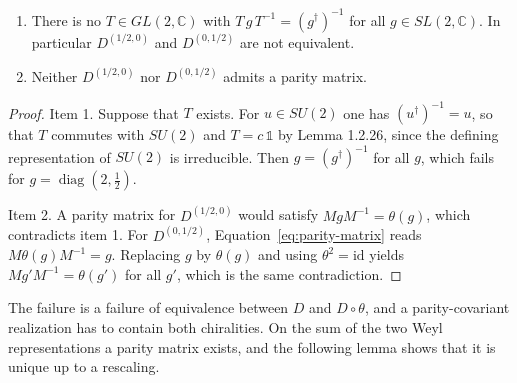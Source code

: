\begin{proposition}\label{prop:parity-problem}
	\begin{enumerate}
		\item There is no $T\in GL(2,\mathbb{C})$ with $T\,g\,T^{-1}=(g^\dagger)^{-1}$ for all $g\in SL(2,\mathbb{C})$. In particular $D^{(1/2,0)}$ and $D^{(0,1/2)}$ are not equivalent.
		\item Neither $D^{(1/2,0)}$ nor $D^{(0,1/2)}$ admits a parity matrix.
	\end{enumerate}
\end{proposition}

\begin{proof}
	Item 1. Suppose that $T$ exists. For $u\in SU(2)$ one has $(u^\dagger)^{-1}=u$, so that $T$ commutes with $SU(2)$ and $T=c\,\mathbb{1}$ by Lemma 1.2.26, since the defining representation of $SU(2)$ is irreducible. Then $g=(g^\dagger)^{-1}$ for all $g$, which fails for $g=\operatorname{diag}(2,\tfrac12)$.
	
	Item 2. A parity matrix for $D^{(1/2,0)}$ would satisfy $MgM^{-1}=\theta(g)$, which contradicts item 1. For $D^{(0,1/2)}$, Equation~\eqref{eq:parity-matrix} reads $M\theta(g)M^{-1}=g$. Replacing $g$ by $\theta(g)$ and using $\theta^2=\mathrm{id}$ yields $Mg'M^{-1}=\theta(g')$ for all $g'$, which is the same contradiction.
\end{proof}

The failure is a failure of equivalence between $D$ and $D\circ\theta$, and a parity-covariant realization has to contain both chiralities. On the sum of the two Weyl representations a parity matrix exists, and the following lemma shows that it is unique up to a rescaling.

